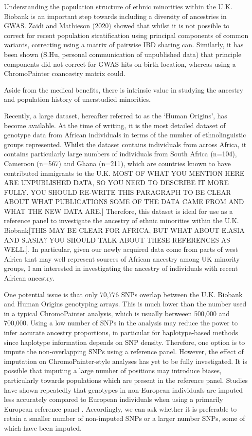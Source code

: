 Understanding the population structure of ethnic minorities within the U.K. Biobank is an important step towards including a diversity of ancestries in GWAS. Zaidi and Mathieson (2020) \cite{zaidi2020demographic} showed that whilst it is not possible to correct for recent population stratification using principal components of common variants, correcting using a matrix of pairwise IBD sharing can. Similarly, it has been shown (S.Hu, personal communication of unpublished data) that principle components did not correct for GWAS hits on birth location, whereas using a ChromoPainter coancestry matrix could. 

Aside from the medical benefits, there is intrinsic value in studying the ancestry and population history of unerstudied minorities. 


Recently, a large dataset, hereafter referred to as the `Human Origins', has become available. At the time of writing, it is the most detailed dataset of genotype data from African individuals in terms of the number of ethnolinguistic groups represented. Whilst the dataset contains individuals from across Africa, it contains particularly large numbers of individuals from South Africa (n=104), Cameroon (n=567) and Ghana (n=211), which are countries known to have contributed immigrants to the U.K. MOST OF WHAT YOU MENTION HERE ARE UNPUBLISHED DATA, SO YOU NEED TO DESCRIBE IT MORE FULLY. YOU SHOULD RE-WRITE THIS PARAGRAPH TO BE CLEAR ABOUT WHAT PUBLICATIONS SOME OF THE DATA CAME FROM AND WHAT THE NEW DATA ARE.] Therefore, this dataset is ideal for use as a reference panel to investigate the ancestry of ethnic minorities within the U.K. Biobank[THIS MAY BE CLEAR FOR AFRICA, BUT WHAT ABOUT E.ASIA AND S.ASIA? YOU SHOULD TALK ABOUT THESE REFERENCES AS WELL.]. In particular, given our newly acquired data come from parts of west Africa that may well represent sources of African ancestry among UK minority groups, I am interested in investigating the ancestry of individuals with recent African ancestry. 

One potential issue is that only 70,776 SNPs overlap between the U.K. Biobank and Human Origins genotyping arrays. This is much lower than the number used in a typical ChromoPainter analysis, which is usually betweeen 500,000 and 700,000. Using a low number of SNPs in the analysis may reduce the power to infer accurate ancestry proportions, in particular for haplotype-based methods since haplotype information depends on SNP density. Therefore, one option is to impute the non-overlapping SNPs using a reference panel. However, the effect of imputation on ChromoPainter-style analyses has yet to be fully investigated. It is possible that imputing a large number of positions may introduce biases, particularly towards populations which are present in the reference panel. Studies have shown repeatedly that genotypes in non-European individuals are imputed less accurately compared to European individuals when using a primarily European reference panel \cite{delaneau2018integrative, taliun2021sequencing}. Accordingly, we can ask whether it is preferable to retain a smaller number of non-imputed SNPs or a larger number SNPs, some of which have been imputed. 

